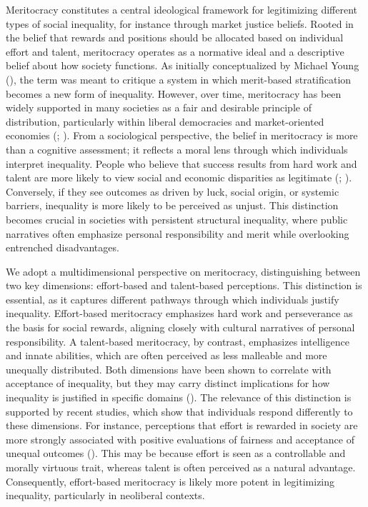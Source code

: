 \documentclass[
  12pt,
]{article}
\begin{document}
Meritocracy constitutes a central ideological framework for legitimizing
different types of social inequality, for instance through market
justice beliefs. Rooted in the belief that rewards and positions should
be allocated based on individual effort and talent, meritocracy operates
as a normative ideal and a descriptive belief about how society
functions. As initially conceptualized by Michael Young
(), the term was meant to critique a
system in which merit-based stratification becomes a new form of
inequality. However, over time, meritocracy has been widely supported in
many societies as a fair and desirable principle of distribution,
particularly within liberal democracies and market-oriented economies
(;
). From a sociological
perspective, the belief in meritocracy is more than a cognitive
assessment; it reflects a moral lens through which individuals interpret
inequality. People who believe that success results from hard work and
talent are more likely to view social and economic disparities as
legitimate (;
).
Conversely, if they see outcomes as driven by luck, social origin, or
systemic barriers, inequality is more likely to be perceived as unjust.
This distinction becomes crucial in societies with persistent structural
inequality, where public narratives often emphasize personal
responsibility and merit while overlooking entrenched disadvantages.

We adopt a multidimensional perspective on meritocracy, distinguishing
between two key dimensions: effort-based and talent-based perceptions.
This distinction is essential, as it captures different pathways through
which individuals justify inequality. Effort-based meritocracy
emphasizes hard work and perseverance as the basis for social rewards,
aligning closely with cultural narratives of personal responsibility. A
talent-based meritocracy, by contrast, emphasizes intelligence and
innate abilities, which are often perceived as less malleable and more
unequally distributed. Both dimensions have been shown to correlate with
acceptance of inequality, but they may carry distinct implications for
how inequality is justified in specific domains
().
The relevance of this distinction is supported by recent studies, which
show that individuals respond differently to these dimensions. For
instance, perceptions that effort is rewarded in society are more
strongly associated with positive evaluations of fairness and acceptance
of unequal outcomes (). This may be because effort is seen as a controllable and morally
virtuous trait, whereas talent is often perceived as a natural
advantage. Consequently, effort-based meritocracy is likely more potent
in legitimizing inequality, particularly in neoliberal contexts.
\end{document}
